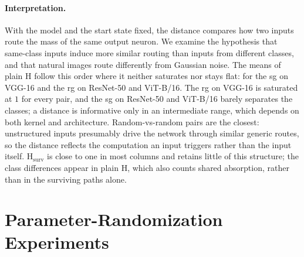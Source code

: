 \paragraph{Interpretation.}
With the model and the start state fixed, the distance compares how two inputs route the mass of the same output neuron. We examine the hypothesis that same-class inputs induce more similar routing than inputs from different classes, and that natural images route differently from Gaussian noise. The means of plain $\mathrm H$ follow this order where it neither saturates nor stays flat: for the \ac{sg} on VGG-16 and the \ac{rg} on ResNet-50 and ViT-B/16. The \ac{rg} on VGG-16 is saturated at $1$ for every pair, and the \ac{sg} on ResNet-50 and ViT-B/16 barely separates the classes; a distance is informative only in an intermediate range, which depends on both kernel and architecture. Random-vs-random pairs are the closest: unstructured inputs presumably drive the network through similar generic routes, so the distance reflects the computation an input triggers rather than the input itself. $\mathrm H_{\mathrm{surv}}$ is close to one in most columns and retains little of this structure; the class differences appear in plain $\mathrm H$, which also counts shared absorption, rather than in the surviving paths alone.

\begin{table}[htbp]
\TableContent{
    \centering\small
    \setlength{\tabcolsep}{4pt}
    
    }%
\caption[Reference baselines for the input-noise sweep]{Reference baselines for the input-noise sweep, averaged over $R$ pairs drawn from the
    $565$-image ImageNet-S test split (clean rows: $R=200$ sampled pairs; clean-vs-random: $R=565$
    images paired with a fresh Gaussian each; random-vs-random: $R=200$ Gaussian pairs); entries are
    mean $\pm$ standard deviation over pairs. \textbf{clean-intraclass}: $\mathrm{H}(\Pi_A(x_1),
        \Pi_A(x_2))$ with $x_1, x_2$ from the same ground-truth class; \textbf{clean-interclass}: same,
    with distinct classes; \textbf{clean-vs-random}: one side clean, other Gaussian;
    \textbf{random-vs-random}: both sides Gaussian. Both laws of a pair start from the same output
    state, the model's argmax class for the first input.}
    \label{ptnb:tab:hellinger-input-random}
\end{table}
\par\medskip
\section{Parameter-Randomization Experiments}\label{ptnb:app:sanity-check}\label{subsec:hellinger_randomization}

